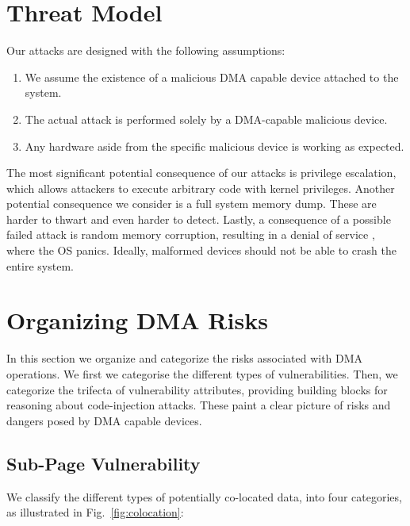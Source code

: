 \section{Threat Model}\label{sec:threat_model}

Our attacks are designed with the following assumptions:
\begin{enumerate}
    \item We assume the existence of a malicious DMA capable device attached to the system.
    \item The actual attack is performed solely by a DMA-capable malicious device.
    \item Any hardware aside from the specific malicious device is working as expected.
 \end{enumerate}

The most significant potential consequence of our attacks is privilege escalation, which allows attackers to execute arbitrary code with kernel privileges. Another potential consequence we consider is a full system memory dump. These are harder to thwart and even harder to detect. Lastly, a consequence of a possible failed attack is random memory corruption, resulting in a denial of service \cite{MMT16}, where the OS panics. Ideally, malformed devices should not be able to crash the entire system. 

\section{Organizing DMA Risks}\label{sec:dma-risks}
In this section we organize and categorize the risks associated with DMA operations.
We first we categorise the different types of \subpage{} vulnerabilities.
Then, we categorize the trifecta of vulnerability attributes, providing building blocks for reasoning about code-injection attacks.
These paint a clear picture of risks and dangers posed by DMA capable devices.

\subsection{Sub-Page Vulnerability}\label{sec:subpage}

We classify the different types of potentially co-located data, into four categories, as illustrated in Fig.~\ref{fig:colocation}:


